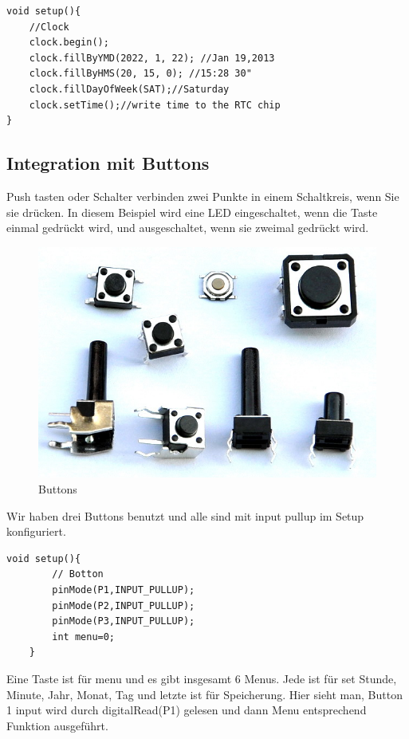 \documentclass[conference]{IEEEtran}
\begin{document}
\begin{lstlisting}[style=CStyle]
void setup(){
	//Clock
	clock.begin();
	clock.fillByYMD(2022, 1, 22); //Jan 19,2013
	clock.fillByHMS(20, 15, 0); //15:28 30"
	clock.fillDayOfWeek(SAT);//Saturday
	clock.setTime();//write time to the RTC chip
}
\end{lstlisting}\textbf{}

\subsection{Integration mit Buttons}
Push tasten oder Schalter verbinden zwei Punkte in einem Schaltkreis, wenn Sie sie drücken. In diesem Beispiel wird eine LED eingeschaltet, wenn die Taste einmal gedrückt wird, und ausgeschaltet, wenn sie zweimal gedrückt wird.

\begin{figure}[h]
	\begin{center}
		\includegraphics[scale=0.25]{btn}
	\end{center}
	\caption{Buttons}
\end{figure}

Wir haben drei Buttons benutzt und alle sind mit input pullup im Setup konfiguriert. 

\begin{lstlisting}[style=CStyle]
	void setup(){
		// Botton
		pinMode(P1,INPUT_PULLUP);
		pinMode(P2,INPUT_PULLUP);
		pinMode(P3,INPUT_PULLUP);
		int menu=0;
	}
\end{lstlisting}\textbf{}

Eine Taste ist für menu und es gibt insgesamt 6 Menus. Jede ist für set Stunde, Minute, Jahr, Monat,  Tag und letzte ist für Speicherung.  Hier sieht man, Button 1 input wird durch digitalRead(P1) gelesen und dann Menu entsprechend Funktion ausgeführt. 
\end{document}
